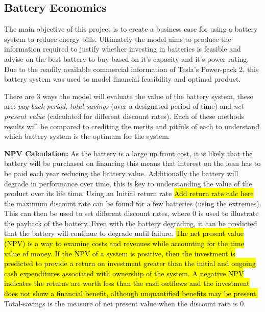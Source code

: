 \subsection{Battery Economics}\label{battery-economics}

The main objective of this project is to create a business case for
using a battery system to reduce energy bills. Ultimately the model aims
to produce the information required to justify whether investing in
batteries is feasible and advise on the best battery to buy based on
it's capacity and it's power rating. Due to the readily available
commercial information of Tesla's Power-pack 2, this battery system was
used to model financial feasibility and optimal product.

There are 3 ways the model will evaluate the value of the battery
system, these are: \emph{pay-back period}, \emph{total-savings} (over a
designated period of time) and \emph{net present value} (calculated for
different discount rates). Each of these methods results will be
compared to crediting the merits and pitfuls of each to understand which
battery system is the optimum for the system.

\textbf{NPV Calculation:} As the battery is a large up front cost, it is
likely that the battery will be purchased on financing this means that
interest on the loan has to be paid each year reducing the battery
value. Additionally the battery will degrade in performance over time,
this is key to understanding the value of the product over its life
time. Using an Initial return rate \hl{Add return rate calc here} the
maximum discount rate can be found for a few batteries (using the
extremes). This can then be used to set different discount rates, where
0 is used to illustrate the payback of the battery. Even with the
battery degrading, it can be predicted that the battery will continue to
degrade until failure.
\hl{The net present value (NPV) is a way to examine costs and revenues while accounting for the time value of money. If the NPV of a system is positive, then the investment is predicted to provide a return on investment greater than the initial and ongoing cash expenditures associated with ownership of the system. A negative NPV indicates the returns are worth less than the cash outflows and the investment does not show a financial benefit, although unquantified benefits may be present.}
\cite{diorio2015economic} Total-savings is the measure of net present
value when the discount rate is 0.

